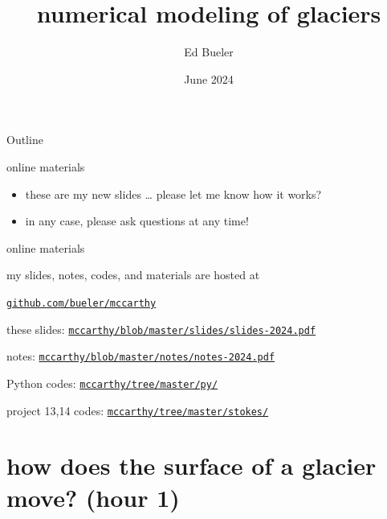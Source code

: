 \documentclass[10pt,dvipsnames]{beamer}
\title{numerical modeling of glaciers}
\date{June 2024}
\author{Ed Bueler}
\institute{Porphyry Place, McCarthy, Alaska}
\begin{document}
\graphicspath{{figs/}{../figures/}}

\maketitle

\begin{frame}{Outline}
  \tableofcontents
\end{frame}

\begin{frame}{online materials}

\begin{itemize}
\item these are my \alert{new slides} \dots\xspace please let me know how it works?
\item in any case, \alert{please ask questions at any time!}
\end{itemize}

\bigskip

\begin{block}{online materials}

my slides, notes, codes, and materials are hosted at

\medskip
\centerline{\href{https://github.com/bueler/mccarthy}{\texttt{github.com/bueler/mccarthy}}}
\end{block}

\medskip
{\footnotesize
these slides: {\footnotesize \href{https://github.com/bueler/mccarthy/blob/master/slides/slides-2024.pdf}{\texttt{mccarthy/blob/master/slides/slides-2024.pdf}}}

notes: {\footnotesize \href{https://github.com/bueler/mccarthy/blob/master/notes/notes-2024.pdf}{\texttt{mccarthy/blob/master/notes/notes-2024.pdf}}}

Python codes: {\footnotesize \href{https://github.com/bueler/mccarthy/tree/master/py}{\texttt{mccarthy/tree/master/py/}}}

project 13,14 codes: {\footnotesize \href{https://github.com/bueler/mccarthy/tree/master/stokes}{\texttt{mccarthy/tree/master/stokes/}}}
}
\end{frame}

\section[how does the surface of a glacier move?]{\textbf{how does the surface of a glacier move?} (hour 1)}
\end{document}

